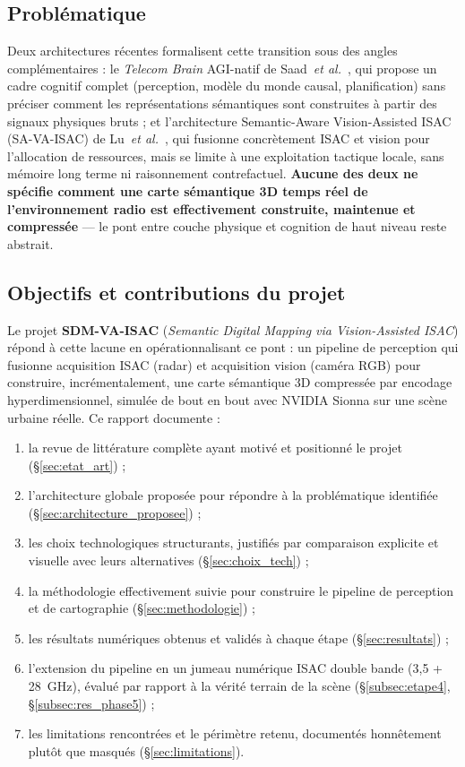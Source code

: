 \documentclass[12pt,a4paper,titlepage]{article}
\begin{document}
\subsection{Problématique}

Deux architectures récentes formalisent cette transition sous des angles complémentaires : le \textit{Telecom Brain} AGI-natif de Saad~\textit{et al.}~\cite{saad2025}, qui propose un cadre cognitif complet (perception, modèle du monde causal, planification) sans préciser comment les représentations sémantiques sont construites à partir des signaux physiques bruts ; et l'architecture Semantic-Aware Vision-Assisted ISAC (SA-VA-ISAC) de Lu~\textit{et al.}~\cite{sa_va_isac_main}, qui fusionne concrètement ISAC et vision pour l'allocation de ressources, mais se limite à une exploitation tactique locale, sans mémoire long terme ni raisonnement contrefactuel. \textbf{Aucune des deux ne spécifie comment une carte sémantique 3D temps réel de l'environnement radio est effectivement construite, maintenue et compressée} --- le pont entre couche physique et cognition de haut niveau reste abstrait.

\subsection{Objectifs et contributions du projet}

Le projet \textbf{SDM-VA-ISAC} (\textit{Semantic Digital Mapping via Vision-Assisted ISAC}) répond à cette lacune en opérationnalisant ce pont : un pipeline de perception qui fusionne acquisition ISAC (radar) et acquisition vision (caméra RGB) pour construire, incrémentalement, une carte sémantique 3D compressée par encodage hyperdimensionnel, simulée de bout en bout avec NVIDIA Sionna sur une scène urbaine réelle. Ce rapport documente :
\begin{enumerate}[leftmargin=1.5em]
    \item la revue de littérature complète ayant motivé et positionné le projet (\S\ref{sec:etat_art}) ;
    \item l'architecture globale proposée pour répondre à la problématique identifiée (\S\ref{sec:architecture_proposee}) ;
    \item les choix technologiques structurants, justifiés par comparaison explicite et visuelle avec leurs alternatives (\S\ref{sec:choix_tech}) ;
    \item la méthodologie effectivement suivie pour construire le pipeline de perception et de cartographie (\S\ref{sec:methodologie}) ;
    \item les résultats numériques obtenus et validés à chaque étape (\S\ref{sec:resultats}) ;
    \item l'extension du pipeline en un jumeau numérique ISAC double bande (3,5 + 28~GHz), évalué par rapport à la vérité terrain de la scène (\S\ref{subsec:etape4}, \S\ref{subsec:res_phase5}) ;
    \item les limitations rencontrées et le périmètre retenu, documentés honnêtement plutôt que masqués (\S\ref{sec:limitations}).
\end{enumerate}
\end{document}
